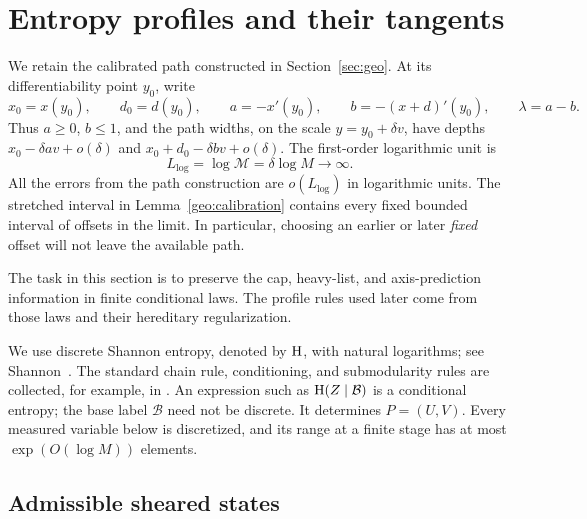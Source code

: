\section{Entropy profiles and their tangents}\label{sec:entropy}

We retain the calibrated path constructed in Section~\ref{sec:geo}.
At its differentiability point $y_0$, write
\[
x_0=x(y_0),\qquad d_0=d(y_0),\qquad
a=-x'(y_0),\qquad b=-(x+d)'(y_0),\qquad \lambda=a-b.
\]
Thus $a\geq0$, $b\leq1$, and the path widths, on the scale
$y=y_0+\delta v$, have depths
$x_0-\delta av+o(\delta)$ and
$x_0+d_0-\delta bv+o(\delta)$.
The first-order logarithmic unit is
\[
L_{\log}=\log\mathcal M=\delta\log M\longrightarrow\infty.
\]
All the errors from the path construction are $o(L_{\log})$ in
logarithmic units.  The stretched interval in
Lemma~\ref{geo:calibration} contains every fixed bounded interval of
offsets in the limit.  In particular, choosing an earlier or later
\emph{fixed} offset will not leave the available path.

The task in this section is to preserve the cap, heavy-list, and
axis-prediction information in finite conditional laws.  The profile
rules used later come from those laws and their hereditary
regularization.

We use discrete Shannon entropy, denoted by $\operatorname{H}$, with natural
logarithms; see Shannon~\cite{Shannon1948}.  The standard chain rule,
conditioning, and submodularity rules are collected, for example,
in \cite[arXiv:0906.4387v5, Appendix~A]{Tao2010Entropy}.
An expression such as $\operatorname{H}(Z\mid\mathcal B)$ is a conditional entropy; the base label $\mathcal B$ need not be discrete.
It determines $P=(U,V)$.  Every measured variable below is discretized,
and its range at a finite stage has at most $\exp(O(\log M))$ elements.

\subsection{Admissible sheared states}

